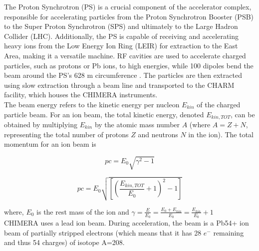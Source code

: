 The Proton Synchrotron (PS) is a crucial component of the accelerator complex, responsible for accelerating particles from the Proton Synchrotron Booster (PSB) to the Super Proton Synchrotron (SPS) and ultimately to the Large Hadron Collider (LHC). Additionally, the PS is capable of receiving and accelerating heavy ions from the Low Energy Ion Ring (LEIR) for extraction to the East Area, making it a versatile machine. RF cavities are used to accelerate charged particles, such as protons or Pb ions, to high energies, while 100 dipoles bend the beam around the PS's 628 m circumference \cite{gilardoni_fifty_2011}. The particles are then extracted using slow extraction through a beam line and transported to the CHARM facility, which houses the CHIMERA instruments.
\\

The beam energy refers to the kinetic energy per nucleon $E_{kin}$ of the charged particle beam. For an ion beam, the total kinetic energy, denoted $E_{kin, TOT}$, can be obtained by multiplying $E_{kin}$ by the atomic mass number $A$ (where $A = Z + N$, representing the total number of protons $Z$ and neutrons $N$ in the ion).  The total momentum for an ion beam is \cite{chao_handbook_2013}

$$pc={E_{0}\sqrt{\gamma^{2}-1}}$$

$$pc = E_{0}\sqrt{\left [ \left( \frac{E_{kin, TOT}}{E_{0}}+1\right )^{2}-1\right ]}$$

where, $E_{0}$ is the rest mass of the ion and $\gamma=\frac{E}{E_{0}}=\frac{E_{0}+E_{kin}}{E_{0}} = \frac{E_{kin}}{E_{0}}+1$
\\

CHIMERA uses a lead ion beam. During acceleration, the beam is a Pb54+ ion beam of partially stripped electrons (which means that it has 28 $e^{-}$ remaining and thus 54 charges) of isotope A=208.
\\

